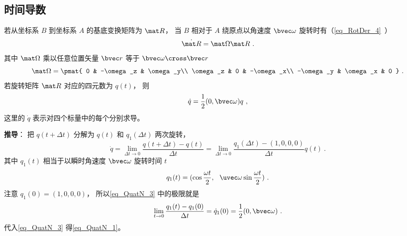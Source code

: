 \subsection{时间导数}
若从坐标系 $B$ 到坐标系 $A$ 的基底变换矩阵为 $\mat R$， 当 $B$ 相对于 $A$ 绕原点以角速度 $\bvec \omega$ 旋转时有（\autoref{eq_RotDer_4}~）
\begin{equation}
\dot{\mat R} = \mat \Omega \mat R~.
\end{equation}
其中 $\mat\Omega$ 乘以任意位置矢量 $\bvec r$ 等于 $\bvec \omega \cross \bvec r$
\begin{equation}
\mat \Omega = \pmat{
0 & -\omega_z & \omega_y\\
\omega_z & 0 & -\omega_x\\
-\omega_y & \omega_x & 0
}~.\end{equation}
若旋转矩阵 $\mat R$ 对应的四元数为 $q(t)$， 则
\begin{equation}\label{eq_QuatN_1}
\dot {q} = \frac12 (0, \bvec \omega) q~,
\end{equation}
这里的 $\dot{q}$ 表示对四个标量中的每个分别求导。

\textbf{推导}： 把 ${q}(t+\Delta t)$ 分解为 ${q}(t)$ 和 ${q}_1(\Delta t)$ 两次旋转， 
\begin{equation}\label{eq_QuatN_3}
\dot {q}
= \lim_{\Delta t\to 0}\frac{{q}(t+\Delta t) - {q}(t)}{\Delta t}
= \lim_{\Delta t\to 0}\frac{{q}_1(\Delta t) - (1,0,0,0)}{\Delta t}q(t)~.
\end{equation}
其中 ${q}_1(t)$ 相当于以瞬时角速度 $\bvec \omega$ 旋转时间 $t$
\begin{equation}
{q_1}(t) = (\cos\frac{\omega t}{2},\ \ \uvec \omega \sin\frac{\omega t}{2})~.
\end{equation}
注意 $q_1(0) = (1,0,0,0)$， 所以\autoref{eq_QuatN_3} 中的极限就是
\begin{equation}
\lim_{t\to 0}\frac{{q}_1(t) - {q}_1(0)}{\Delta t} = \dot{q}_1(0) = \frac{1}{2}(0, \bvec\omega)~.
\end{equation}
代入\autoref{eq_QuatN_3} 得\autoref{eq_QuatN_1}。
